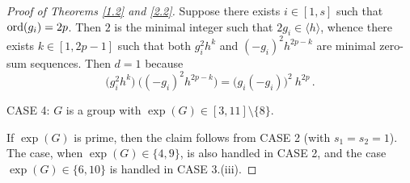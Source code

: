 \documentclass[a4paper,10pt]{amsart}
\theoremstyle{plain}
\theoremstyle{definition}
\numberwithin{equation}{section}
\begin{document}
\begin{proof}[Proof of Theorems \ref{1.2} and \ref{2.2}]
Suppose there exists $i\in [1,s]$ such that $\operatorname{ord}(g_i)=2p$. Then $2$ is the minimal integer such that $2g_i\in \langle h\rangle$, whence there exists $k\in [1, 2p-1]$ such that both $g_i^2h^k$ and $(-g_i)^2h^{2p-k}$ are minimal zero-sum sequences. Then $d=1$ because
\[
\big(g_i^2h^k \big)\ \big((-g_i)^2h^{2p-k} \big) = \big(g_i(-g_i) \big)^2 \ h^{2p}\,.
\]




\medskip
\noindent
CASE 4: $G$ is a  group with $\exp (G) \in [3,11]\setminus \{8\}$.

If $\exp (G)$ is  prime, then the claim follows from CASE 2 (with $s_1=s_2=1$). The case, when $\exp (G) \in \{4, 9\}$,  is also handled in CASE 2,  and the case $\exp (G) \in \{6, 10\}$ is handled in CASE 3.(iii).
\end{proof}
\end{document}
